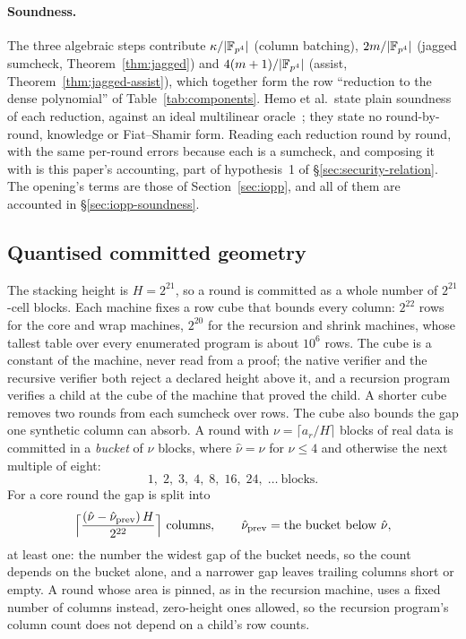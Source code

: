 \paragraph{Soundness.} The three algebraic steps contribute $\kappa/|\mathbb{F}_{p^4}|$ (column batching), $2m/|\mathbb{F}_{p^4}|$ (jagged sumcheck, Theorem~\ref{thm:jagged}) and $4(m+1)/|\mathbb{F}_{p^4}|$ (assist, Theorem~\ref{thm:jagged-assist}), which together form the row ``reduction to the dense polynomial'' of Table~\ref{tab:components}. Hemo et al.\ state plain soundness of each reduction, against an ideal multilinear oracle~\citep[Thm.~1.4]{jagged-pcs}; they state no round-by-round, knowledge or Fiat--Shamir form. Reading each reduction round by round, with the same per-round errors because each is a sumcheck, and composing it with \WHIR{} is this paper's accounting, part of hypothesis~1 of \S\ref{sec:security-relation}. The opening's terms are those of Section~\ref{sec:iopp}, and all of them are accounted in \S\ref{sec:iopp-soundness}.

\subsection{Quantised committed geometry}
\label{sec:pcs-geometry}

The stacking height is $H=2^{21}$, so a round is committed as a whole number of $2^{21}$-cell blocks. Each machine fixes a row cube that bounds every column: $2^{22}$ rows for the core and wrap machines, $2^{20}$ for the recursion and shrink machines, whose tallest table over every enumerated program is about $10^6$ rows. The cube is a constant of the machine, never read from a proof; the native verifier and the recursive verifier both reject a declared height above it, and a recursion program verifies a child at the cube of the machine that proved the child. A shorter cube removes two rounds from each sumcheck over rows. The cube also bounds the gap one synthetic column can absorb. A round with $\nu=\lceil a_r/H\rceil$ blocks of real data is committed in a \emph{bucket} of $\hat\nu$ blocks, where $\hat\nu=\nu$ for $\nu\le4$ and otherwise the next multiple of eight:
\[
  1,\;2,\;3,\;4,\;8,\;16,\;24,\;\ldots\ \text{blocks}.
\]
For a core round the gap is split into
\[
  \Bigl\lceil \frac{(\hat\nu-\hat\nu_{\mathrm{prev}})\,H}{2^{22}} \Bigr\rceil
  \ \text{columns},\qquad \hat\nu_{\mathrm{prev}}=\text{the bucket below }\hat\nu,
\]
at least one: the number the widest gap of the bucket needs, so the count depends on the bucket alone, and a narrower gap leaves trailing columns short or empty. A round whose area is pinned, as in the recursion machine, uses a fixed number of columns instead, zero-height ones allowed, so the recursion program's column count does not depend on a child's row counts.

